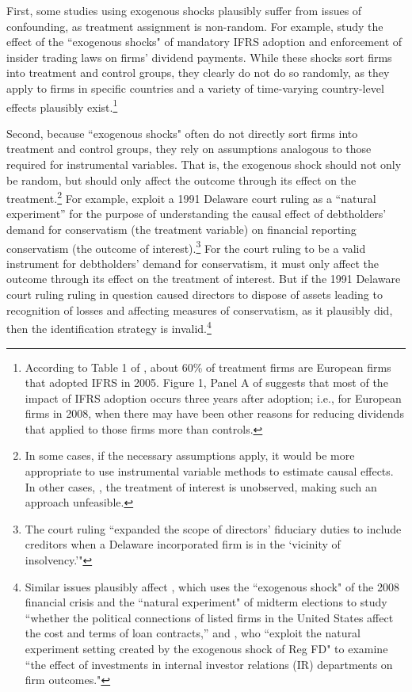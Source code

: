 \documentclass[11pt,reqno,titlepage]{amsart}
\begin{document}
\begin{doublespace}
First, some studies using exogenous shocks plausibly suffer from issues of confounding, as treatment assignment is non-random.
For example, \citet{Hail:2014fq} study the effect of the ``exogenous shocks" of mandatory IFRS adoption and enforcement of insider trading laws on firms' dividend payments.
While these shocks sort firms into treatment and control groups, they clearly do not do so randomly, as they apply to firms in specific countries and a variety of time-varying country-level effects plausibly exist.\footnote{
According to Table 1 of \citet{Hail:2014fq}, about 60\% of treatment firms are European firms that adopted IFRS in 2005. Figure 1, Panel A of \citet{Hail:2014fq} suggests that most of the impact of IFRS adoption occurs three years after adoption; i.e., for European firms in 2008, when there may have been other reasons for reducing dividends that applied to those firms more than controls.}

Second, because ``exogenous shocks" often do not directly sort firms into treatment and control groups, they rely on assumptions analogous to those required for instrumental variables.
That is, the exogenous shock should not only be random, but should only affect the outcome through its effect on the treatment.\footnote{
In some cases, if the necessary assumptions apply, it would be more appropriate to use instrumental variable methods to estimate causal effects.
In other cases, \citep[e.g.][]{Aier:2014ii}, the treatment of interest is unobserved, making such an approach unfeasible.}
For example, \cite{Aier:2014ii} exploit a 1991 Delaware court ruling as a ``natural experiment'' for the purpose of understanding the causal effect of debtholders' demand for conservatism (the treatment variable) on financial reporting conservatism (the outcome of interest).\footnote{
The court ruling ``expanded the scope of directors' fiduciary duties to include creditors when a Delaware incorporated firm is in the `vicinity of insolvency.'"}
For the court ruling to be a valid instrument for debtholders' demand for conservatism, it must only affect the outcome through its effect on the treatment of interest.
But if the 1991 Delaware court ruling  ruling in question caused directors to dispose of assets leading to recognition of losses and affecting measures of conservatism, as it plausibly did, then the identification strategy is invalid.\footnote{
Similar issues plausibly affect \citet{Houston:2014hv}, which uses the ``exogenous shock" of the 2008 financial crisis and the ``natural experiment" of midterm elections to study ``whether the political connections of listed firms in the United States affect the cost and terms of loan contracts,'' and \citet{Kirk:2014gx}, who ``exploit the natural experiment setting created by the exogenous shock of Reg FD" to examine ``the effect of investments in internal investor relations (IR) departments on firm outcomes."} 


\end{doublespace}
\end{document}
